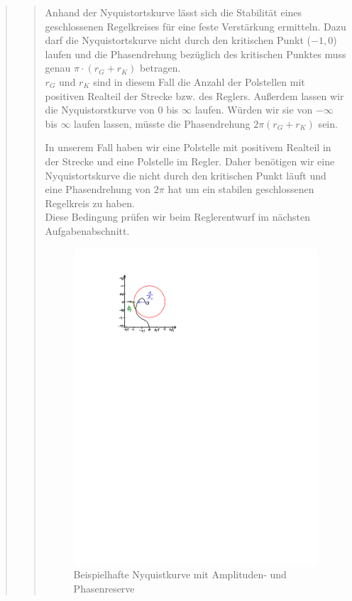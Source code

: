 \begin{quote}
\begin{quote}
        Anhand der Nyquistortskurve lässt sich die Stabilität eines geschlossenen Regelkreises für eine feste
        Verstärkung ermitteln. Dazu darf die Nyquistortskurve nicht durch den kritischen Punkt ($-1,0$) laufen und
        die Phasendrehung bezüglich des kritischen Punktes muss genau $\pi \cdot (r_G + r_K)$ betragen.\\
        $r_G$ und $r_K$ sind in diesem Fall die Anzahl der Polstellen mit positiven Realteil der Strecke bzw. des
        Reglers.
        Außerdem lassen wir die Nyquistorstkurve von $0$ bis $\infty$ laufen. Würden wir sie von $-\infty$ bis $\infty$
        laufen lassen, müsste die Phasendrehung $2\pi (r_G + r_K)$ sein.\vspace{1em}
        
        In unserem Fall haben wir eine Polstelle mit positivem Realteil in der Strecke und eine Polstelle im Regler. Daher
        benötigen wir eine Nyquistortskurve die nicht durch den kritischen Punkt läuft und eine Phasendrehung von $2\pi$ hat um
        ein stabilen geschlossenen Regelkreis zu haben.\\
        Diese Bedingung prüfen wir beim Reglerentwurf im nächsten Aufgabenabschnitt.\vspace{1em}
        
        \begin{figure}[H]
        \centering
            \includegraphics[scale=1.3, trim = 4cm 20.5cm 12.5cm 2cm, clip]{Bilder/Nyquist_beispiel}
                \caption{Beispielhafte Nyquistkurve mit Amplituden- und Phasenreserve}
                \label{fig:Nyquist_beispiel}
        \end{figure}
        

\end{quote}
\end{quote}

